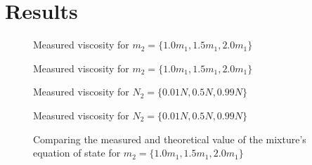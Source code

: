 \chapter{Results}

\begin{figure}[htbp]
    \begin{center}
        
        \caption{
            Measured viscosity for $m_2 = 
            \{1.0m_1, 1.5m_1, 2.0m_1\}$
        }
    \end{center}
\end{figure}
\begin{figure}[htbp]
    \begin{center}
        
        \caption{
            Measured viscosity for $m_2 = 
            \{1.0m_1, 1.5m_1, 2.0m_1\}$
        }
    \end{center}
\end{figure}


\begin{figure}[htbp]
    \begin{center}
        
        \caption{
            Measured viscosity for $N_2 = 
            \{0.01N, 0.5N, 0.99N\}$
        }
    \end{center}
\end{figure}

\begin{figure}[htbp]
    \begin{center}
        
        \caption{
            Measured viscosity for $N_2 = 
            \{0.01N, 0.5N, 0.99N\}$
        }
    \end{center}
\end{figure}
%
%        
\begin{figure}[htbp]
    \begin{center}
        
    \end{center}
        \caption{
            Comparing the measured and theoretical value of the mixture's
            equation of state for $m_2 = \{1.0m_1, 1.5m_1, 2.0m_1\}$
        }
\end{figure}

